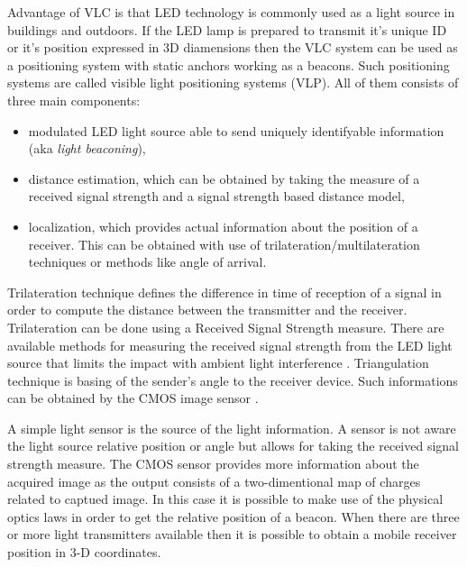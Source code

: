 \documentclass[../main.tex]{subfiles}
\begin{document}
Advantage of VLC is that LED technology is commonly used as a light source in buildings and outdoors. If the LED lamp is prepared to transmit it's unique ID or it's position expressed in 3D diamensions then the VLC system can be used as a positioning system with static anchors working as a beacons. Such positioning systems are called visible light positioning systems (VLP). All of them consists of three main components:
\begin{itemize}
	\item modulated LED light source able to send uniquely identifyable information (aka \textit{light beaconing}\cite{visible_light_positioning_epsilon}),
	\item distance estimation, which can be obtained by taking the measure of a received signal strength and a signal strength based distance model,
	\item localization, which provides actual information about the position of a receiver. This can be obtained with use of trilateration/multilateration techniques\cite{visible_light_positioning_epsilon} or methods like angle of arrival\cite{visible_light_positioning}.
\end{itemize}

Trilateration technique defines the difference in time of reception of a signal in order to compute the distance between the transmitter and the receiver. Trilateration can be done using a Received Signal Strength measure. There are available methods for measuring the received signal strength from the LED light source that limits the impact with ambient light interference \cite{visible_light_positioning_epsilon}. Triangulation technique is basing of the sender's angle to the receiver device. Such informations can be obtained by the CMOS image sensor \cite{visible_light_positioning}.

A simple light sensor is the source of the light information. A sensor is not aware the light source relative position or angle but allows for taking the received signal strength measure. The CMOS sensor provides more information about the acquired image as the output consists of a two-dimentional map of charges related to captued image. In this case it is possible to make use of the physical optics laws in order to get the relative position of a beacon. When there are three or more light transmitters available then it is possible to obtain a mobile receiver position in 3-D coordinates.
\end{document}
